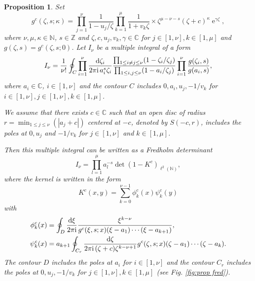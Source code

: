 \documentclass[cmp]{svjour}
\numberwithin{theorem}{section}
\numberwithin{equation}{section}
\DeclareMathOperator{\e}{e}
\def\dd{{\rm d}}
\def\ii{{\rm i}}
\newtheorem{prop}[theorem]{Proposition}
\begin{document}
\smallskip
\begin{prop}
\label{prop:fredholm}
Set 
\begin{equation} 
g^c(\zeta,s ; \kappa) = \prod_{j=1}^\nu \frac{1}{1-u_j/\zeta}
\prod_{k=1}^\mu \frac{1}{1+v_k \zeta} \times \zeta^{\mu-\nu-s}  
{(\zeta + c)}^\kappa \e^{\gamma\zeta}, \label{gmndef} 
\end{equation}
where $\nu,\mu,\kappa\in\mathbb{N}$, $s\in\mathbb{Z}$ and $\zeta,c,u_j,v_k,\gamma\in\mathbb{C}$ for $j\in [1,\nu],k\in [1,\mu]$
and $g(\zeta,s)=g^c(\zeta,s;0)$. 
Let $I_{\nu}$ be a multiple integral of a form
\begin{equation}
\label{Inu}
I_\nu
=
\frac{1}{\nu!} \oint_C \prod_{i=1}^{\nu}
\frac{\dd \zeta_i}{2\pi \ii\,a_i^s \zeta_i}
\frac{\prod_{1\le i\neq j\le \nu} (1-\zeta_i/\zeta_j)}{\prod_{1\le i,j\le \nu}(1-a_i/\zeta_j)}
\prod_{i=1}^{\nu} \frac{g(\zeta_i,s)}{g(a_i,s)},
\end{equation}
where $a_i\in\mathbb{C}$, $i\in [1,\nu]$ and the contour $C$ includes $0,a_i,u_j,-1/v_k$ 
for $i\in [1,\nu], j\in [1,\nu],k\in [1,\mu]$. 

We assume that there exists $c\in\mathbb{C}$ such that 
an open disc of radius $r = \min_{1 \leq j \leq \nu}{( |a_j + c| )}$ centered at $-c$, denoted by $S(-c,r)$, includes the poles at $0, u_j$ and $-1/v_k$ for $j\in[1,\nu]$ and $k\in[1,\mu]$. 

Then this multiple integral can be written as a Fredholm determinant
\begin{equation}
\label{Inu_Fredform}
 I_{\nu} = \prod_{l=1}^{\mu}{ a_l^{-s }}  \det(1-K^{c})_{\ell^2(\mathbb{N})},
\end{equation}
where the kernel is written in the form
\begin{equation*}
 K^{c}(x,y) = \sum_{k=0}^{\nu-1} \phi^{c}_k(x) \psi^{c}_k(y)
\end{equation*}
with
\begin{align}
\phi^{c}_k(x)
&=
\oint_D \frac{\dd \xi}{2\pi\ii}
\frac{\xi^{k-\nu}}{ g^{c}(\xi,s ; x )
(\xi-a_1)\cdots (\xi-a_{k+1})} ,
\label{phi}
\\
\psi^{c}_k(x)
&=
a_{k+1} \oint_{C_r} \frac{\dd \zeta}{2\pi\ii\, (\zeta + c)  \zeta^{k-\nu+1}}
g^{c}(\zeta,s ; x)(\zeta-a_1)\cdots (\zeta-a_k)
\label{psi}.
\end{align}
The contour $D$ includes the poles at $a_i$ for $i\in[1,\nu]$ and 
the contour $C_r$ includes the poles at $0,u_j,-1/v_k$ for $j\in[1,\nu], k\in[1,\mu]$ 
(see Fig. \ref{fig:prop fred}). 

\begin{figure}[h!]
\begin{center}
\begin{tikzpicture}[scale=3.5]
			

\end{tikzpicture}
\end{center}
\end{figure}
\end{prop}
\end{document}

